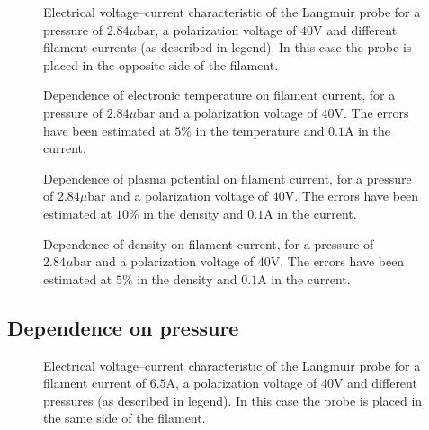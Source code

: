 \documentclass[11pt,a4 paper]{article}
\begin{document}
\begin{figure}[H]
	\centering
	\caption{Electrical voltage--current characteristic of the Langmuir probe for a pressure of $2.84\si{\mu\bar}$, a polarization voltage of $40\si{\volt}$ and different filament currents (as described in legend). In this case the probe is placed in the opposite side of the filament.}
	\label{fig:Lang:sx_cur}
\end{figure}

\begin{figure}[H]
	\centering
	\caption{Dependence of electronic temperature on filament current, for a pressure of $2.84\si{\mu\bar}$ and a polarization voltage of $40\si{\volt}$. The errors have been estimated at $5\%$ in the temperature and $0.1\si{\ampere}$ in the current.}
	\label{fig:Lang:Te_f}
\end{figure}

\begin{figure}[H]
	\centering
	\caption{Dependence of plasma potential on filament current, for a pressure of $2.84\si{\mu\bar}$ and a polarization voltage of $40\si{\volt}$. The errors have been estimated at $10\%$ in the density and $0.1\si{\ampere}$ in the current.}
	\label{fig:Lang:n_f}
\end{figure}

\begin{figure}[H]
	\centering
	\caption{Dependence of density on filament current, for a pressure of $2.84\si{\mu\bar}$ and a polarization voltage of $40\si{\volt}$. The errors have been estimated at $5\%$ in the density and $0.1\si{\ampere}$ in the current.}
	\label{fig:Lang:Vp_f}
\end{figure}

\subsection{Dependence on pressure}
\begin{figure}[H]
	\centering
	\caption{Electrical voltage--current characteristic of the Langmuir probe for a filament current of $6.5\si{\ampere}$, a polarization voltage of $40\si{\volt}$ and different pressures (as described in legend). In this case the probe is placed in the same side of the filament.}
	\label{fig:Lang:dx_p}
\end{figure}
\end{document}

